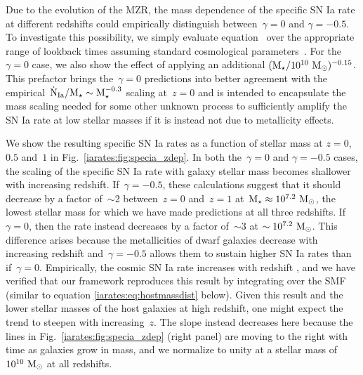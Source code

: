 \par
Due to the evolution of the MZR, the mass dependence of the specific SN Ia rate
at different redshifts could empirically distinguish between~$\gamma = 0$ and
$\gamma = -0.5$.
To investigate this possibility, we simply evaluate equation~
over the appropriate range of lookback times assuming standard cosmological
parameters~\citep{PlanckCollaboration2014}.
For the~$\gamma = 0$ case, we also show the effect of applying an additional
$(\text{M}_\star / 10^{10}~\text{M}_\odot)^{-0.15}$.
This prefactor brings the~$\gamma = 0$ predictions into better agreement with
the empirical~$\dot{\text{N}}_\text{Ia} / \text{M}_\star \sim \text{M}_\star^{-0.3}$ scaling
at~$z = 0$ and is intended to encapsulate the mass scaling needed for some
other unknown process to sufficiently amplify the SN Ia rate at low stellar
masses if it is instead not due to metallicity effects.
\par
We show the resulting specific SN Ia rates as a function of stellar mass at
$z = 0$,~$0.5$ and~$1$ in Fig.~\ref{iarates:fig:specia_zdep}.
In both the~$\gamma = 0$ and $\gamma = -0.5$ cases, the scaling of the specific
SN Ia rate with galaxy stellar mass becomes shallower with increasing redshift.
If~$\gamma = -0.5$, these calculations suggest that it should decrease by a
factor of~$\sim$2 between~$z = 0$ and~$z = 1$ at~$\text{M}_\star \approx
10^{7.2}~\text{M}_\odot$, the lowest stellar mass for which we have made predictions at
all three redshifts.
If~$\gamma = 0$, then the rate instead decreases by a factor of~$\sim$3 at
$\sim 10^{7.2}~\text{M}_\odot$.
This difference arises because the metallicities of dwarf galaxies decrease
with increasing redshift and~$\gamma = -0.5$ allows them to sustain higher
SN Ia rates than if~$\gamma = 0$.
Empirically, the cosmic SN Ia rate increases with redshift
\citep[e.g.][]{Graur2014}, and we have verified that our framework reproduces
this result by integrating over the SMF (similar to equation
\ref{iarates:eq:hostmassdist} below).
Given this result and the lower stellar masses of the host galaxies at high
redshift, one might expect the trend to steepen with increasing~$z$.
The slope instead decreases here because the lines in Fig.~\ref{iarates:fig:specia_zdep}
(right panel) are moving to the right with time as galaxies grow in mass, and
we normalize to unity at a stellar mass of~$10^{10}~\text{M}_\odot$ at all redshifts.

